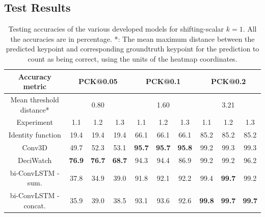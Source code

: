 \documentclass[./main.tex]{subfiles}
\begin{document}
\subsection{Test Results}
\label{subsec:finetune_test_res}
\begin{table}[htbp]
    \begin{tabular}{c||ccc|ccc|ccc}
        \hline
        Accuracy metric & \multicolumn{3}{c}{PCK@0.05} & \multicolumn{3}{c}{PCK@0.1} & \multicolumn{3}{c}{PCK@0.2} \\
        \hline
        Mean threshold distance* & \multicolumn{3}{c}{0.80} & \multicolumn{3}{c}{1.60} & \multicolumn{3}{c}{3.21} \\
        \hline
        Experiment & 1.1 & 1.2 & 1.3 & 1.1 & 1.2 & 1.3 & 1.1 & 1.2 & 1.3 \\
        \hline
        \hline
        Identity function & 19.4 & 19.4 & 19.4 & 66.1 & 66.1 & 66.1 & 85.2 & 85.2 & 85.2 \\
        Conv3D & 49.7 & 52.3 & 53.1 & \textbf{95.7} & \textbf{95.7} & \textbf{95.8} & 99.2 & 99.3 & 99.3 \\
        DeciWatch & \textbf{76.9} & \textbf{76.7} & \textbf{68.7} & 94.3 & 94.4 & 86.9 & 99.2 & 99.2 & 96.2 \\
        bi-ConvLSTM - sum. & 37.8 & 34.9 & 39.0 & 91.8 & 92.1 & 92.2 & 99.4 & \textbf{99.7} & 99.2 \\
        bi-ConvLSTM - concat. & 35.9 & 39.0 & 38.5 & 93.1 & 93.6 & 92.6 & \textbf{99.8} & \textbf{99.7} & \textbf{99.7} \\
        \hline
    \end{tabular}
    \caption{Testing accuracies of the various developed models for shifting-scalar $k = 1$. All the accuracies are in percentage. *: The mean maximum distance between the predicted keypoint and corresponding groundtruth keypoint for the prediction to count as being correct, using the units of the heatmap coordinates.}
    \label{tab:finetune_test_accs_1}
\end{table}
\end{document}
